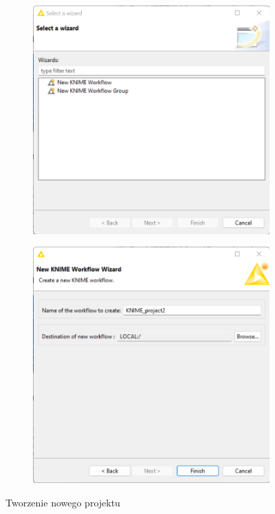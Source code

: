 \documentclass[11pt]{report}
\begin{document}
\begin{figure}
    \centering
    \begin{subfigure}{.5\textwidth}
        \centering
        \includegraphics[width=.8\linewidth]{tworzenie_nowego_projektu.png}
    \end{subfigure}%
    \begin{subfigure}{.5\textwidth}
        \centering
        \includegraphics[width=.8\linewidth]{tworzenie_nowego_projektu_2.png}
    \end{subfigure}
    \caption{Tworzenie nowego projektu}
    \label{fig:tworzenie_nowego_projektu}
\end{figure}
\end{document}
